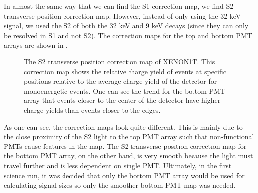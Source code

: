 In almost the same way that we can find the S1 correction map, we find S2 transverse position correction map.  However, instead of only using the 32 keV signal, we used the S2 of both the 32 keV and 9 keV decays (since they can only be resolved in S1 and not S2).  The correction maps for the top and bottom PMT arrays are shown in .


\begin{figure}[t]
	\centering
	 \hfill
	\caption{The S2 transverse position correction map of XENON1T.  This correction map shows the relative charge yield of events at specific positions relative to the average charge yield of the detector for monoenergetic events.  One can see the trend for the bottom PMT array that events closer to the center of the detector have higher charge yields than events closer to the edges.}
	\label{fig:xe1t_s2_correction_map_xy}
\end{figure}

As one can see, the correction maps look quite different.  This is mainly due to the close proximity of the S2 light to the top PMT array such that non-functional PMTs cause features in the map.  The S2 transverse position correction map for the bottom PMT array, on the other hand, is very smooth because the light must travel further and is less dependent on single PMT.  Ultimately, in the first science run, it was decided that only the bottom PMT array would be used for calculating signal sizes so only the smoother bottom PMT map was needed.

